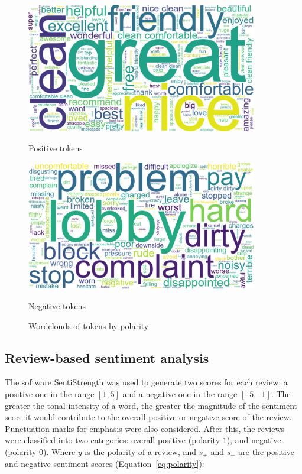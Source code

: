 \documentclass[12pt, a4paper]{pancake-article}
\begin{document}
\begin{figure}[htpb]
	\centering
	\begin{minipage}{0.5\textwidth}
		\centering
		\includegraphics[width=0.9\textwidth]{../results/old/wordcloud_1.png}
		\caption*{Positive tokens}
	\end{minipage}\hfill
	\begin{minipage}{0.5\textwidth}
		\centering
		\includegraphics[width=0.9\textwidth]{../results/old/wordcloud_0.png}
		\caption*{Negative tokens}
	\end{minipage}
	\caption{Wordclouds of tokens by polarity}
	\label{fig:wordclouds}
\end{figure}

\subsection{Review-based sentiment analysis}\label{sec:reviews}

The software SentiStrength was used to generate two scores for each review:
a positive one in the range \(\left[1, 5\right]\) and a negative one in the range \(\left[–5, –1\right]\).
The greater the tonal intensity of a word, the greater the magnitude of the sentiment score
it would contribute to the overall positive or negative score of the review. Punctuation marks for
emphasis were also considered. After this, the reviews were classified into two categories: overall
positive (polarity \(1\)), and negative (polarity \(0\)). Where \(y\) is the polarity
of a review, and \(s_+\) and \(s_-\) are the positive and negative sentiment scores (Equation~\ref{eq:polarity}):
\end{document}

